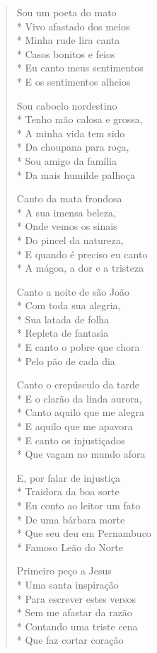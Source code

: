 \begin{verse}
Sou um poeta do mato\\*
Vivo afastado dos meios\\*
Minha rude lira canta\\*
Casos bonitos e feios\\*
Eu canto meus sentimentos\\*
E os sentimentos alheios

Sou caboclo nordestino\\*
Tenho mão calosa e grossa,\\*
A minha vida tem sido\\*
Da choupana para roça,\\*
Sou amigo da família\\*
Da mais humilde palhoça

Canto da mata frondosa\\*
A sua imensa beleza,\\*
Onde vemos os sinais\\*
Do pincel da natureza,\\*
E quando é preciso eu canto\\*
A mágoa, a dor e a tristeza

Canto a noite de são João\\*
Com toda sua alegria,\\*
Sua latada de folha\\*
Repleta de fantasia\\*
E canto o pobre que chora\\*
Pelo pão de cada dia

Canto o crepúsculo da tarde\\*
E o clarão da linda aurora,\\*
Canto aquilo que me alegra\\*
E aquilo que me apavora\\*
E canto os injustiçados\\*
Que vagam no mundo afora

E, por falar de injustiça\\*
Traidora da boa sorte\\*
Eu conto ao leitor um fato\\*
De uma bárbara morte\\*
Que seu deu em Pernambuco\\*
Famoso Leão do Norte

Primeiro peço a Jesus\\*
Uma santa inspiração\\*
Para escrever estes versos\\*
Sem me afastar da razão\\*
Contando uma triste cena\\*
Que faz cortar coração


\end{verse}
